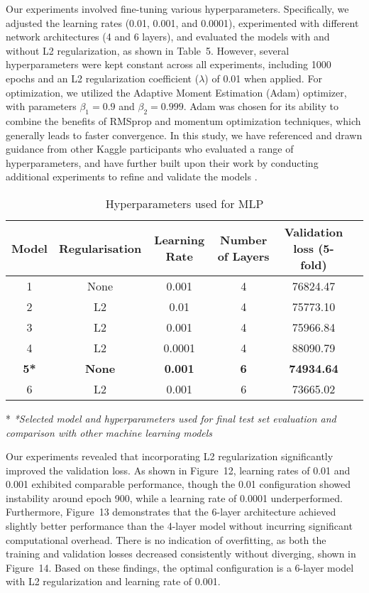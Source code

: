 \documentclass{article}
\begin{document}
Our experiments involved fine-tuning various hyperparameters. Specifically, we adjusted the learning rates (0.01, 0.001, and 0.0001), experimented with different network architectures (4 and 6 layers), and evaluated the models with and without L2 regularization, as shown in Table~5. However, several hyperparameters were kept constant across all experiments, including 1000 epochs and an L2 regularization coefficient ($\lambda$) of 0.01 when applied. For optimization, we utilized the Adaptive Moment Estimation (Adam) optimizer, with parameters $\beta_1 = 0.9$ and $\beta_2 = 0.999$. Adam was chosen for its ability to combine the benefits of RMSprop and momentum optimization techniques, which generally leads to faster convergence. In this study, we have referenced and drawn guidance from other Kaggle participants who evaluated a range of hyperparameters, and have further built upon their work by conducting additional experiments to refine and validate the models \cite{fujimori2024prediction, danishyousufdeeplearning}.

\begin{table}[h]
  \centering
  \caption[Hyperparameters used for MLP]{Hyperparameters used for MLP}
  \begin{tabular}{cccccr}
      \hline
      \textbf{Model} & \textbf{Regularisation} & \textbf{Learning Rate} & \textbf{Number of Layers} & \textbf{Validation loss (5-fold)} \\
      \hline
      1 & None & 0.001 & 4 & 76824.47 \\
      2 & L2 & 0.01 & 4 & 75773.10 \\
      3 & L2 & 0.001 & 4 & 75966.84 \\
      4 & L2 & 0.0001 & 4 & 88090.79 \\
      \textbf{5*} & \textbf{None} & \textbf{0.001} & \textbf{6} & \textbf{74934.64} \\
      6 & L2 & 0.001 & 6 & 73665.02 \\
      \hline
  \end{tabular}
  \begin{tablenotes}
        \item[*] \textit{*Selected model and hyperparameters used for final test set evaluation and comparison with other machine learning models}
  \end{tablenotes}
\end{table}

Our experiments revealed that incorporating L2 regularization significantly improved the validation loss. As shown in Figure~12, learning rates of 0.01 and 0.001 exhibited comparable performance, though the 0.01 configuration showed instability around epoch 900, while a learning rate of 0.0001 underperformed. Furthermore, Figure~13 demonstrates that the 6-layer architecture achieved slightly better performance than the 4-layer model without incurring significant computational overhead. There is no indication of overfitting, as both the training and validation losses decreased consistently without diverging, shown in Figure~14. Based on these findings, the optimal configuration is a 6-layer model with L2 regularization and learning rate of 0.001.
\end{document}
